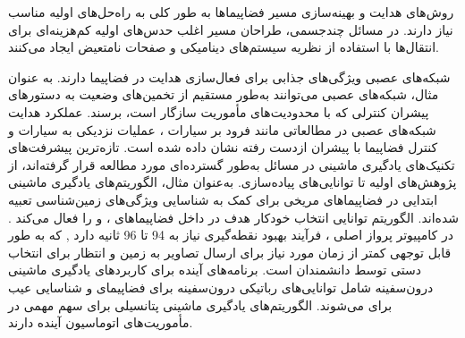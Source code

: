 \documentclass[a4paper]{article}
\begin{document}
{روش‌های هدایت و بهینه‌سازی مسیر فضاپیماها به طور کلی به راه‌حل‌های اولیه مناسب نیاز دارند. در مسائل چندجسمی، طراحان مسیر اغلب حدس‌های اولیه کم‌هزینه‌ای برای انتقال‌ها با استفاده از نظریه سیستم‌های دینامیکی و صفحات نامتعیض
\cite{2013AcAau, Haapala}
 ایجاد می‌کنند. 




شبکه‌های عصبی ویژگی‌های جذابی برای فعال‌سازی هدایت در فضاپیما دارند. به عنوان مثال، شبکه‌های عصبی می‌توانند به‌طور مستقیم از تخمین‌های وضعیت به دستورهای پیشران کنترلی که با محدودیت‌های مأموریت سازگار است، برسند. عملکرد هدایت شبکه‌های عصبی در مطالعاتی مانند فرود بر سیارات \cite{gaudet2020six}، عملیات نزدیکی به سیارات \cite{gaudet2020terminal} و کنترل فضاپیما با پیشران ازدست رفته \cite{rubinsztejn2020neural} نشان داده شده است.
تازه‌ترین پیشرفت‌های تکنیک‌های یادگیری ماشینی در مسائل  به‌طور گسترده‌ای مورد مطالعه قرار گرفته‌اند، از پژوهش‌های اولیه تا توانایی‌های پیاده‌سازی.
به‌عنوان مثال، الگوریتم‌های یادگیری ماشینی ابتدایی در فضاپیماهای مریخی برای کمک به شناسایی ویژگی‌های زمین‌شناسی تعبیه شده‌اند. الگوریتم  توانایی انتخاب خودکار هدف  در داخل فضاپیماهای ،  و  را فعال می‌کند
\cite{estlin2012aegis}.
  در کامپیوتر پرواز اصلی ، فرآیند بهبود نقطه‌گیری نیاز به 94 تا 96 ثانیه دارد 
  \cite{francis2017aegis},
   که به طور قابل توجهی کمتر از زمان مورد نیاز برای ارسال تصاویر به زمین و انتظار برای انتخاب دستی توسط دانشمندان است.
   برنامه‌های آینده برای کاربردهای یادگیری ماشینی درون‌سفینه شامل توانایی‌های رباتیکی درون‌سفینه برای فضاپیمای 
\cite{higa2019vision, rothrock2016spoc}
     و شناسایی عیب برای 
\cite{wagstaff2019enabling} می‌شوند. الگوریتم‌های یادگیری ماشینی پتانسیلی برای سهم مهمی در مأموریت‌های اتوماسیون آینده دارند.


}
\end{document}
